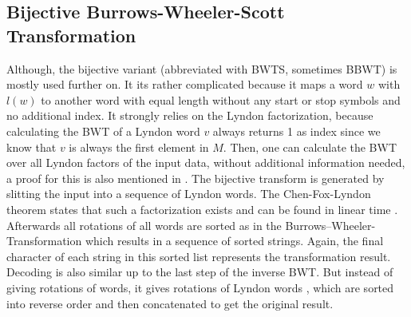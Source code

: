 \subsection{Bijective Burrows-Wheeler-Scott Transformation}
\label{ch:Principles of compression:sec:Other:subSec:bwtscott}
\par{
Although, the bijective variant (abbreviated with BWTS, sometimes BBWT) is mostly used further on. It its rather complicated because it maps a word $w$ with $l(w)$ to another word with equal length without any start or stop symbols and no additional index. It strongly relies on the Lyndon factorization, because calculating the BWT of a Lyndon word $v$ always returns 1 as index since we know that $v$ is always the first element in $M$. Then, one can calculate the BWT over all Lyndon factors of the input data, without additional information needed, a proof for this is also mentioned in \cite{kufleitner2009bijective}. The bijective transform is generated by slitting the input into a sequence of Lyndon words. The Chen-Fox-Lyndon \cite{chenFoxlyndonTheorem} theorem states that such a factorization exists and can be found in linear time \cite{lyndonFactorLinearTime}. Afterwards all rotations of all words are sorted as in the Burrows–Wheeler-Transformation which results in a sequence of sorted strings. Again, the final character of each string in this sorted list represents the transformation result. Decoding is also similar up to the last step of the inverse BWT. But instead of giving rotations of words, it gives rotations of Lyndon words , which are sorted into reverse order and then concatenated to get the original result.
}

